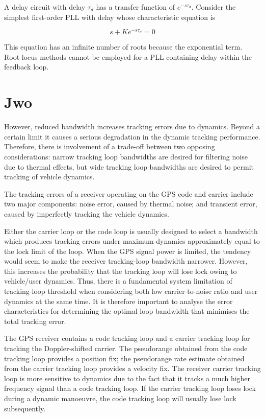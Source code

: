 A delay circuit with delay $\tau_d$ has a transfer function of $e^{-s\tau_d}$. Consider the simplest first-order PLL with delay whose characteristic equation is 

\begin{equation}
s + K e^{-s\tau_d}=0
\end{equation}

This equation has an infinite number of roots because the exponential term. Root-locus methods cannot be employed for a PLL containing delay within the feedback loop. 

\section{Jwo}
\cite{Jwo}
However, reduced bandwidth increases
tracking errors due to dynamics. Beyond a certain limit it causes a serious degradation in the
dynamic tracking performance. Therefore, there is involvement of a trade-off between two
opposing considerations: narrow tracking loop bandwidths are desired for filtering noise due to
thermal effects, but wide tracking loop bandwidths are desired to permit tracking of vehicle
dynamics.

The tracking errors of a receiver operating on the GPS code
and carrier include two major components: noise error,
caused by thermal noise; and transient error, caused by
imperfectly tracking the vehicle dynamics.

Either the carrier loop or the code loop is usually
designed to select a bandwidth which produces tracking
errors under maximum dynamics approximately equal to
the lock limit of the loop. When the GPS signal power is
limited, the tendency would seem to make the receiver
tracking-loop bandwidth narrower. However, this increases
the probability that the tracking loop will lose lock owing
to vehicle/user dynamics. Thus, there is a fundamental
system limitation of tracking-loop threshold when considering
both low carrier-to-noise ratio and user dynamics at
the same time. It is therefore important to analyse the error
characteristics for determining the optimal loop bandwidth
that minimises the total tracking error.

The GPS receiver contains a code tracking loop and a
carrier tracking loop for tracking the Doppler-shifted
carrier. The pseudorange obtained from the code tracking
loop provides a position fix; the pseudorange rate estimate
obtained from the carrier tracking loop provides a velocity
fix. The receiver carrier tracking loop is more sensitive to
dynamics due to the fact that it tracks a much higher
frequency signal than a code tracking loop. If the carrier
tracking loop loses lock during a dynamic manoeuvre, the
code tracking loop will usually lose lock subsequently.

